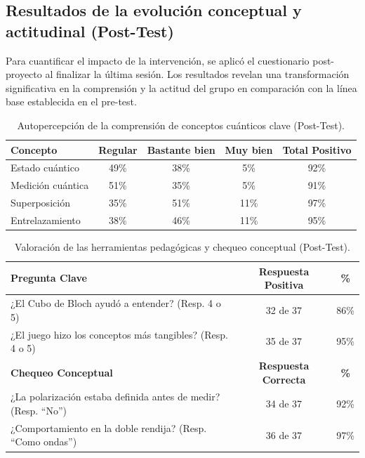 \documentclass[10pt,a4paper]{article}
\begin{document}
\subsection{Resultados de la evolución conceptual y actitudinal (Post-Test)}

Para cuantificar el impacto de la intervención, se aplicó el cuestionario post-proyecto al finalizar la última sesión. Los resultados revelan una transformación significativa en la comprensión y la actitud del grupo en comparación con la línea base establecida en el pre-test.

\begin{table}[h!]
\centering
\caption{Autopercepción de la comprensión de conceptos cuánticos clave (Post-Test).}
\label{tab:post_concepts}
\begin{tabular}{|l|c|c|c|c|}
\hline
\textbf{Concepto} & \textbf{Regular} & \textbf{Bastante bien} & \textbf{Muy bien} & \textbf{Total Positivo} \\
\hline
Estado cuántico & 49\% & 38\% & 5\% & 92\% \\
Medición cuántica & 51\% & 35\% & 5\% & 91\% \\
Superposición & 35\% & 51\% & 11\% & 97\% \\
Entrelazamiento & 38\% & 46\% & 11\% & 95\% \\
\hline
\end{tabular}
\end{table}

\begin{table}[h!]
\centering
\caption{Valoración de las herramientas pedagógicas y chequeo conceptual (Post-Test).}
\label{tab:post_tools}
\begin{tabular}{|l|c|c|}
\hline
\textbf{Pregunta Clave} & \textbf{Respuesta Positiva} & \textbf{\%} \\
\hline
¿El Cubo de Bloch ayudó a entender? (Resp. 4 o 5) & 32 de 37 & 86\% \\
¿El juego hizo los conceptos más tangibles? (Resp. 4 o 5) & 35 de 37 & 95\% \\
\hline
\textbf{Chequeo Conceptual} & \textbf{Respuesta Correcta} & \textbf{\%} \\
\hline
¿La polarización estaba definida antes de medir? (Resp. ``No'') & 34 de 37 & 92\% \\
¿Comportamiento en la doble rendija? (Resp. ``Como ondas'') & 36 de 37 & 97\% \\
\hline
\end{tabular}
\end{table}
\end{document}
